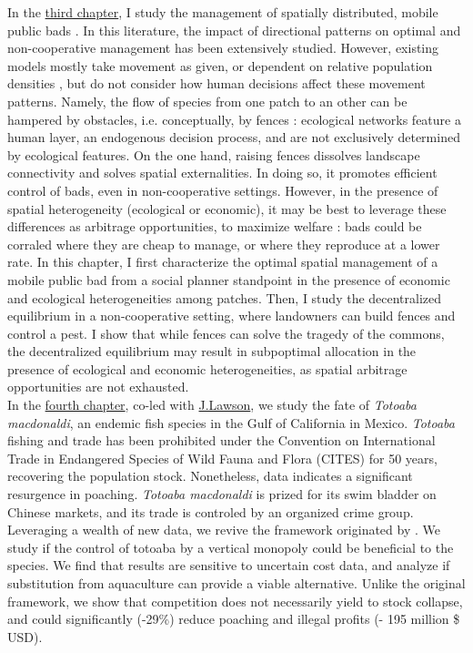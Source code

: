 In the \hyperref[chapter3]{third chapter}, I study the management of spatially distributed, mobile public bads \citep{costello_private_2017}.
In this literature, the impact of directional patterns on optimal and non-cooperative management has been extensively studied. However, existing models mostly take movement as given, or dependent on relative population densities \citep{huffaker_optimal_1992,bhat_controlling_1996, sanchirico_bioeconomics_1999}, but do not consider how human decisions affect these movement patterns. 
Namely, the flow of species from one patch to an other can be hampered by obstacles, i.e. conceptually, by fences : ecological networks feature a human layer, an endogenous decision process, and are not exclusively determined by ecological features. On the one hand, raising fences dissolves landscape connectivity and solves spatial externalities. In doing so, it promotes efficient control of bads, even in non-cooperative settings. However, in the presence of spatial heterogeneity (ecological or economic), it may be best to leverage these differences as arbitrage opportunities, to maximize welfare : bads could be corraled where they are cheap to manage, or where they reproduce at a lower rate. In this chapter, I first characterize the optimal spatial management of a mobile public bad from a social planner standpoint in the presence of economic and ecological heterogeneities among patches. Then, I study the decentralized equilibrium in a non-cooperative setting, where landowners can build fences and control a pest. I show that while fences can solve the tragedy of the commons, the decentralized equilibrium may result in subpoptimal allocation in the presence of ecological and economic heterogeneities, as spatial arbitrage opportunities are not exhausted. \\

In the \hyperref[chapter4]{fourth chapter}, co-led with \href{https://www.juliamlawson.com/}{J.Lawson}, we study the fate of \textit{Totoaba macdonaldi}, an endemic fish species in the Gulf of California in Mexico. \textit{Totoaba} fishing and trade has been prohibited under the Convention on International Trade in Endangered Species of Wild Fauna and Flora (CITES) for 50 years, recovering the population stock. Nonetheless, data indicates a significant resurgence in poaching. \textit{Totoaba macdonaldi} is prized for its swim bladder on Chinese markets, and its trade is controled by an organized crime group. Leveraging a wealth of new data, we revive the framework originated by \cite{damania_economics_2007}. We study if the control of totoaba by a vertical monopoly could be beneficial to the species. We find that results are sensitive to uncertain cost data, and analyze if substitution from aquaculture can provide a viable alternative. Unlike the original framework, we show that competition does not necessarily yield to stock collapse, and could significantly (-29\%) reduce poaching and illegal profits (- 195 million \$ USD).
\clearpage




